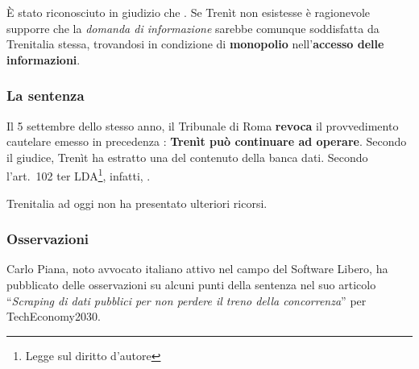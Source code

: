\documentclass[12pt,a4paper,italian]{report}
\begin{document}
È stato riconosciuto in giudizio che .  Se Trenìt non esistesse è ragionevole supporre che la
\textit{domanda di informazione} sarebbe comunque soddisfatta da
Trenitalia stessa, trovandosi in condizione di \textbf{monopolio}
nell'\textbf{accesso delle informazioni}.

\subsubsection{La sentenza}

Il 5 settembre dello stesso anno, il Tribunale di Roma \textbf{revoca}
il provvedimento cautelare emesso in precedenza \cite{TrenitSentenza}:
\textbf{Trenìt può continuare ad operare}.  Secondo il giudice, Trenìt
ha estratto una  del
contenuto della banca dati.  Secondo l'art.\ 102 ter
LDA\footnote{Legge sul diritto d'autore}, infatti,
.

Trenitalia ad oggi non ha presentato ulteriori ricorsi.

\subsubsection{Osservazioni}

Carlo Piana, noto avvocato italiano attivo nel campo del Software
Libero, ha pubblicato delle osservazioni su alcuni punti della
sentenza nel suo articolo ``\textit{Scraping di dati pubblici per non
    perdere il treno della concorrenza}'' \cite{TrenitPiana} per
TechEconomy2030.
\end{document}
